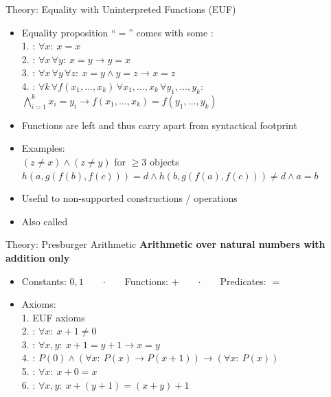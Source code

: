\documentclass[t,english]{sdqbeamer}
\begin{document}
\begin{frame}{Theory: Equality with Uninterpreted Functions (EUF)}
	\begin{itemize}
		\item Equality proposition ``$=$'' comes with some :\\
		1. : $\forall x:\ x=x$\\
		2. : $\forall x \, \forall y:\ x=y \rightarrow y=x$\\
		3. : $\forall x \, \forall y \, \forall z:\ x=y \wedge y=z \rightarrow x=z$\\
		4. : $\forall k \, \forall f(x_1,\ldots,x_k) \, \forall x_1, \ldots, x_k \, \forall y_1, \ldots, y_k:\ $\\
		 $\bigwedge_{i=1}^k x_i = y_i \rightarrow f(x_1,\ldots,x_k) = f(y_1,\ldots,y_k)$
		\item Functions are left  and thus carry  apart from syntactical footprint
		\pause
		\item Examples:\\
		\hspace*{1cm}$(z \neq x) \wedge (z \neq y)$ \hfill {} for $\geq 3$ objects\\
		\hspace*{1cm}$h(a, g(f(b),f(c))) = d \wedge h(b,g(f(a),f(c))) \neq d \wedge a=b$ \hfill {}
		\pause
		\item Useful to  non-supported constructions / operations
		\item Also called 
	\end{itemize}
\end{frame}

\begin{frame}{Theory: Presburger Arithmetic}
	\textbf{Arithmetic over natural numbers with addition only}
	\begin{itemize}
		\item Constants: $0, 1$\ \ \ \ $\cdot$\ \ \ \ Functions: $+$\ \ \ \ $\cdot$\ \ \ \ Predicates: $=$
		\item Axioms:\\
		1. EUF axioms\\
		2. : $\forall x:\ x+1 \neq 0$\\
		3. : $\forall x, y:\ x+1 = y+1 \rightarrow x = y$\\
		4. : $P(0) \wedge (\forall x:\ P(x) \rightarrow P(x+1)) \rightarrow (\forall x:\ P(x))$\\
		5. : $\forall x:\ x+0=x$\\
		6. : $\forall x, y:\ x+(y+1) = (x+y)+1$\\
	\end{itemize}
\end{frame}
\end{document}
